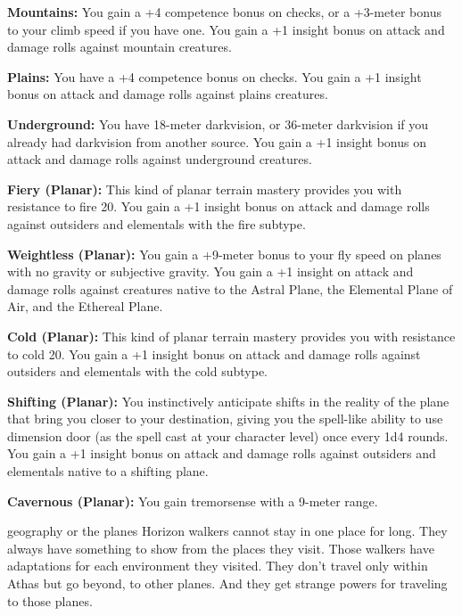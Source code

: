 {\textbf{Mountains:} You gain a +4 competence bonus on  checks, or a +3-meter bonus to your climb speed if you have one. You gain a +1 insight bonus on attack and damage rolls against mountain creatures.

\textbf{Plains:} You have a +4 competence bonus on  checks. You gain a +1 insight bonus on attack and damage rolls against plains creatures.

\textbf{Underground:} You have 18-meter darkvision, or 36-meter darkvision if you already had darkvision from another source. You gain a +1 insight bonus on attack and damage rolls against underground creatures.

\textbf{Fiery (Planar):} This kind of planar terrain mastery provides you with resistance to fire 20. You gain a +1 insight bonus on attack and damage rolls against outsiders and elementals with the fire subtype.

\textbf{Weightless (Planar):} You gain a +9-meter bonus to your fly speed on planes with no gravity or subjective gravity. You gain a +1 insight on attack and damage rolls against creatures native to the Astral Plane, the Elemental Plane of Air, and the Ethereal Plane.

\textbf{Cold (Planar):} This kind of planar terrain mastery provides you with resistance to cold 20. You gain a +1 insight bonus on attack and damage rolls against outsiders and elementals with the cold subtype.

\textbf{Shifting (Planar):} You instinctively anticipate shifts in the reality of the plane that bring you closer to your destination, giving you the spell-like ability to use dimension door (as the spell cast at your character level) once every 1d4 rounds. You gain a +1 insight bonus on attack and damage rolls against outsiders and elementals native to a shifting plane.

\textbf{Cavernous (Planar):} You gain tremorsense with a 9-meter range.
}
{}
{geography or the planes}
{Horizon walkers cannot stay in one place for long. They always have something to show from the places they visit.}
{Those walkers have adaptations for each environment they visited.}
{They don't travel only within Athas but go beyond, to other planes. And they get strange powers for traveling to those planes.}